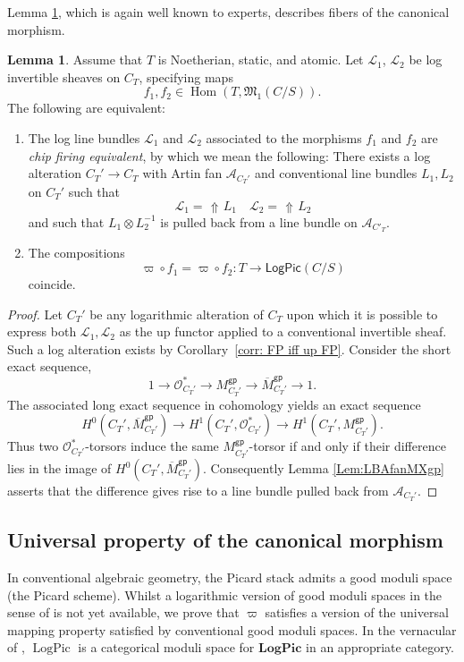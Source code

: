 \documentclass[11pt]{amsart}
\theoremstyle{definition}
\theoremstyle{definition}
\newtheorem{lemma}[theorem]{Lemma}
\DeclareMathOperator{\arrowup}{\!\Uparrow \!}
\begin{document}
Lemma \ref{lem:KernelChipFiring}, which is again well known to experts, describes fibers of the canonical morphism. 

\begin{lemma}\label{lem:KernelChipFiring}
    Assume that $T$ is Noetherian, static, and atomic. Let $\mathcal{L}_1$, $\mathcal{L}_2$ be log invertible sheaves on $C_T$, specifying maps $$f_1,f_2 \in \operatorname{Hom}(T,\mathfrak{M}_1(C/S)).$$
    The following are equivalent:
    \begin{enumerate}
        \item The log line bundles $\mathcal{L}_1$ and $\mathcal{L}_2$ associated to the morphisms $f_1$ and $f_2$ are \textit{chip firing equivalent}, by which we mean the following: There exists a log alteration $C_T'\rightarrow C_T$ with Artin fan $\mathcal{A}_{C_T'}$ and conventional line bundles $L_1,L_2$ on $C_T'$ such that $$\mathcal{L}_1 = \arrowup L_1 \quad \mathcal{L}_2 = \arrowup L_2$$
        and such that $L_1\otimes L_2^{-1}$ is pulled back from a line bundle on $\mathcal{A}_{C'_T}$.
        \item The compositions
        $$\varpi\circ f_1 = \varpi\circ f_2\colon T \longrightarrow \mathsf{LogPic}(C/S)$$ coincide.
    \end{enumerate}
\end{lemma}
\begin{proof}
    Let $C_T'$ be any logarithmic alteration of $C_T$ upon which it is possible to express both $\mathcal{L}_1,\mathcal{L}_2$ as the up functor applied to a conventional invertible sheaf. Such a log alteration exists by Corollary~\ref{corr: FP iff up FP}. Consider the short exact sequence,
    $$1\longrightarrow \mathcal{O}_{C_T'}^\ast \longrightarrow M_{C_T'}^\mathsf{gp}\longrightarrow \overline{M}_{C_T'}^\mathsf{gp}\longrightarrow 1.$$ The associated long exact sequence in cohomology yields an exact sequence $$H^0(C_T',\overline{M}_{C_T'}^\mathsf{gp})\longrightarrow H^1(C_T',\mathcal{O}_{C_T'}^\ast ) \longrightarrow H^1(C_T', M_{C_T'}^\mathsf{gp}).$$ Thus two $\mathcal{O}_{C_T'}^\ast$-torsors induce the same ${M}_{C_T'}^\mathsf{gp}$-torsor if and only if their difference lies in the image of $H^0({C_T'},\overline{M}_{C_T'}^\mathsf{gp})$. Consequently Lemma \ref{Lem:LBAfanMXgp} asserts that the difference gives rise to a line bundle pulled back from $\mathcal{A}_{C_T'}$.
\end{proof}

\subsection{Universal property of the canonical morphism} In conventional algebraic geometry, the Picard stack admits a good moduli space (the Picard scheme). Whilst a logarithmic version of good moduli spaces in the sense of \cite{Alper2013GoodModuli,Alper2014Adequate,DeligneMumford1969} is not yet available, we prove that $\varpi$ satisfies a version of the universal mapping property satisfied by conventional good moduli spaces. In the vernacular of \cite{VBOlssonFan}, $\operatorname{LogPic}$ is a categorical moduli space for $\textbf{LogPic}$ in an appropriate category.
\end{document}
